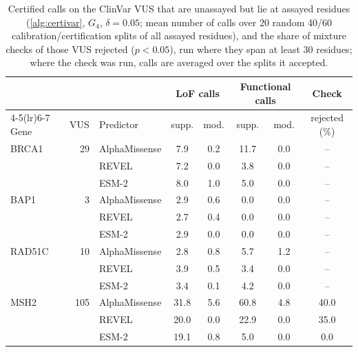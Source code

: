 \begin{table}[ht]
\centering
\caption{Certified calls on the ClinVar VUS that are unassayed but lie at assayed residues (\cref{alg:certivar}, $G_4$,
$\delta=0.05$; mean number of calls over 20 random 40/60 calibration/certification splits of all assayed residues), and
the share of mixture checks of those VUS rejected ($p<0.05$), run where they span at least 30 residues; where the check
was run, calls are averaged over the splits it accepted.}\label{tab:app_usecase_calls}
\setlength{\tabcolsep}{4pt}
\begin{tabular}{lrlccccc}
\toprule
 & & & \multicolumn{2}{c}{LoF calls} & \multicolumn{2}{c}{Functional calls} & Check\\
\cmidrule(lr){4-5}\cmidrule(lr){6-7}
Gene & VUS & Predictor & supp. & mod. & supp. & mod. & rejected (\%)\\
\midrule
BRCA1 & 29 & AlphaMissense & 7.9 & 0.2 & 11.7 & 0.0 & -- \\
 &  & REVEL & 7.2 & 0.0 & 3.8 & 0.0 & -- \\
 &  & ESM-2 & 8.0 & 1.0 & 5.0 & 0.0 & -- \\
\addlinespace[1pt]
BAP1 & 3 & AlphaMissense & 2.9 & 0.6 & 0.0 & 0.0 & -- \\
 &  & REVEL & 2.7 & 0.4 & 0.0 & 0.0 & -- \\
 &  & ESM-2 & 2.9 & 0.0 & 0.0 & 0.0 & -- \\
\addlinespace[1pt]
RAD51C & 10 & AlphaMissense & 2.8 & 0.8 & 5.7 & 1.2 & -- \\
 &  & REVEL & 3.9 & 0.5 & 3.4 & 0.0 & -- \\
 &  & ESM-2 & 3.4 & 0.1 & 4.2 & 0.0 & -- \\
\addlinespace[1pt]
MSH2 & 105 & AlphaMissense & 31.8 & 5.6 & 60.8 & 4.8 & 40.0 \\
 &  & REVEL & 20.0 & 0.0 & 22.9 & 0.0 & 35.0 \\
 &  & ESM-2 & 19.1 & 0.8 & 5.0 & 0.0 & 0.0 \\
\bottomrule
\end{tabular}
\end{table}
